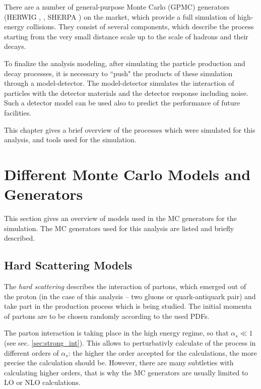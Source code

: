 There are a number of general-purpose Monte Carlo (GPMC) generators (HERWIG \cite{Corcella:2000bw},  \cite{Sjostrand:2006za}, SHERPA \cite{Gleisberg:2003xi})
on the market, which provide a full simulation of high-energy collisions. They consist of several components,
which describe the process starting from the very small distance scale up to the scale of hadrons and their decays. 

To finalize the analysis modeling, after simulating the particle production and decay processes, it is necessary 
to ``push" the products of these simulation through a model-detector. The model-detector simulates the interaction of particles 
with the detector materials and the detector response including noise. Such a detector model can be used also to predict the performance 
of future facilities.

This chapter gives a brief overview of the processes which were simulated for this analysis, and tools used for 
the simulation.

\section{Different Monte Carlo Models and Generators}

This section gives an overview of models used in the MC generators for the simulation. The MC generators used
for this analysis are listed and briefly described.

\subsection{Hard Scattering Models}

The \textit{hard scattering} describes the interaction of partons, which emerged out of the proton (in the case of this analysis 
-- two gluons or quark-antiquark pair) and take part in the production process which is being studied. The initial momenta 
of partons are to be chosen randomly according to the used PDFs.

The parton interaction is taking place in the high energy regime, so that $\alpha_{s} \ll 1$ (see sec. \ref{sec:strong_int}). 
This allows to perturbativly calculate of the process in different orders of $\alpha_{s}$: the higher the order accepted
for the calculations, the more precise the calculation should be. However, there are many subtleties with calculating 
higher orders, that is why the MC generators are usually limited to LO or NLO calculations.


